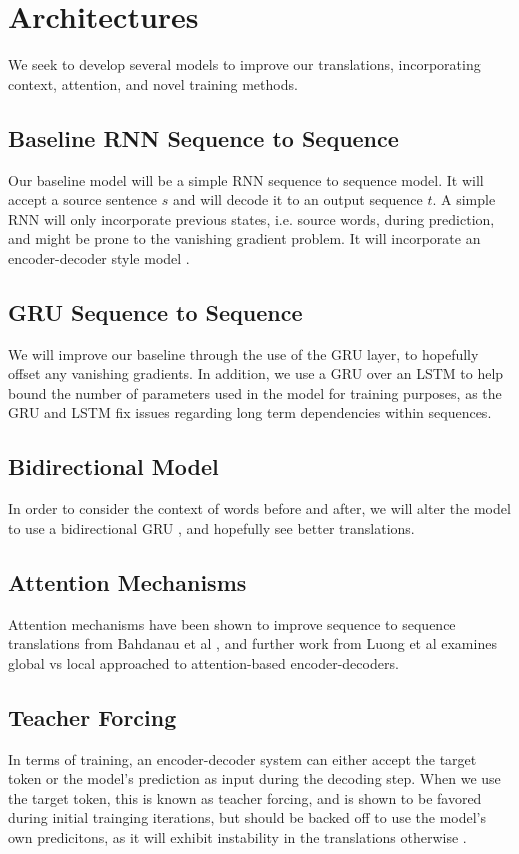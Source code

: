\documentclass[twoside,twocolumn]{article}
\begin{document}
\section{Architectures}
We seek to develop several models to improve our translations, incorporating
context, attention, and novel training methods.

\subsection{Baseline RNN Sequence to Sequence}
Our baseline model will be a simple RNN sequence to sequence model. It will
accept a source sentence $s$ and will decode it to an output sequence $t$. A
simple RNN will only incorporate previous states, i.e. source words, during
prediction, and might be prone to the vanishing gradient problem. It will
incorporate an encoder-decoder style model \cite{cho2014learning}
\cite{sutskever2014sequence}.
\subsection{GRU Sequence to Sequence}
We will improve our baseline through the use of the GRU layer, to hopefully
offset any vanishing gradients. In addition, we use a GRU over an LSTM to help
bound the number of parameters used in the model for training purposes, as the
GRU and LSTM fix issues regarding long term dependencies within sequences.
\subsection{Bidirectional Model}
In order to consider the context of words before and after, we will alter the
model to use a bidirectional GRU \cite{bahdanau2014neural}, and hopefully see
better translations.
\subsection{Attention Mechanisms}
Attention mechanisms have been shown to improve sequence to sequence
translations from Bahdanau et al \cite{bahdanau2014neural}, and further work
from Luong et al \cite{luong2015effective} examines global vs local approached
to attention-based encoder-decoders.
\subsection{Teacher Forcing}
In terms of training, an encoder-decoder system can either accept the target
token or the model's prediction as input during the decoding step. When we use
the target token, this is known as teacher forcing, and is shown to be favored
during initial trainging iterations, but should be backed off to use the
model's own predicitons, as it will exhibit instability in the translations
otherwise \cite{lamb2016professor}.
\end{document}
